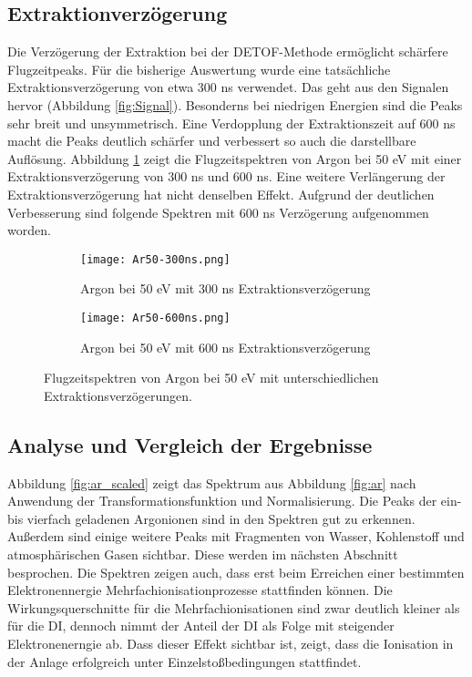 \subsection{Extraktionverzögerung}
Die Verzögerung der Extraktion bei der DETOF-Methode ermöglicht schärfere Flugzeitpeaks. Für die bisherige Auswertung wurde eine tatsächliche Extraktionsverzögerung von etwa 300 ns verwendet. Das geht aus den Signalen hervor (Abbildung \ref{fig:Signal}). Besonderns bei niedrigen Energien sind die Peaks sehr breit und unsymmetrisch. Eine Verdopplung der Extraktionszeit auf 600 ns macht die Peaks deutlich schärfer und verbessert so auch die darstellbare Auflösung. Abbildung \ref{fig:delay} zeigt die Flugzeitspektren von Argon bei 50 eV mit einer Extraktionsverzögerung von 300 ns und 600 ns. Eine weitere Verlängerung der Extraktionsverzögerung hat nicht denselben Effekt. Aufgrund der deutlichen Verbesserung sind folgende Spektren mit 600 ns Verzögerung aufgenommen worden.
\begin{figure}
    \centering
    \begin{subfigure}{.45\textwidth}
        \centering
        \texttt{[image: Ar50-300ns.png]}
        \caption{Argon bei 50 eV mit 300 ns Extraktionsverzögerung}
    \end{subfigure}%
    \hfill
    \begin{subfigure}{.45\textwidth}
        \centering
        \texttt{[image: Ar50-600ns.png]}
        \caption{Argon bei 50 eV mit 600 ns Extraktionsverzögerung}
        
    \end{subfigure}
    \caption[Einfluss der Extraktionsverzögerung auf Flugzeitspektren]{Flugzeitspektren von Argon bei 50 eV mit unterschiedlichen Extraktionsverzögerungen.}
    \label{fig:delay}
\end{figure}

\subsection{Analyse und Vergleich der Ergebnisse}
Abbildung \ref{fig:ar_scaled} zeigt das Spektrum aus Abbildung \ref{fig:ar} nach Anwendung der Transformationsfunktion und Normalisierung. Die Peaks der ein- bis vierfach geladenen Argonionen sind in den Spektren gut zu erkennen. Außerdem sind einige weitere Peaks mit Fragmenten von Wasser, Kohlenstoff und atmosphärischen Gasen sichtbar. Diese werden im nächsten Abschnitt besprochen. Die Spektren zeigen auch, dass erst beim Erreichen einer bestimmten Elektronennergie Mehrfachionisationprozesse stattfinden können. Die Wirkungsquerschnitte für die Mehrfachionisationen sind zwar deutlich kleiner als für die DI, dennoch nimmt der Anteil der DI als Folge mit steigender Elektronenerngie ab. Dass dieser Effekt sichtbar ist, zeigt, dass die Ionisation in der Anlage erfolgreich unter Einzelstoßbedingungen stattfindet. 


